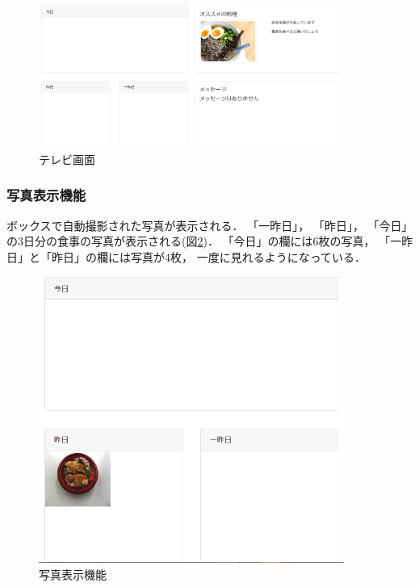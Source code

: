 \documentclass[../report]{subfiles}
\begin{document}
\begin{figure}[htbp]
    \begin{center}
        \includegraphics[width=10cm]{imgs/5_tv.png}
        \caption{テレビ画面}
        \label{fig:5_tv-all}
    \end{center}
\end{figure}

\subsubsection{写真表示機能}
ボックスで自動撮影された写真が表示される．
「一昨日」， 「昨日」， 「今日」の3日分の食事の写真が表示される(図\ref{fig:5_tv-days})．
「今日」の欄には6枚の写真， 「一昨日」と「昨日」の欄には写真が4枚， 一度に見れるようになっている．

\begin{figure}[htbp]
    \begin{center}
        \includegraphics[width=10cm]{imgs/5_tv1.png}
        \caption{写真表示機能}
        \label{fig:5_tv-days}
    \end{center}
\end{figure}
\end{document}
